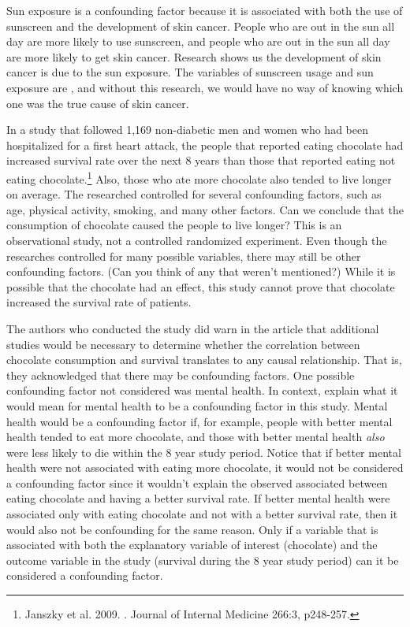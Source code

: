 Sun exposure is a confounding factor because it is associated with both the use of sunscreen and the development of skin cancer. People who are out in the sun all day are more likely to use sunscreen, and people who are out in the sun all day are more likely to get skin cancer. Research shows us the development of skin cancer is due to the sun exposure. The variables of sunscreen usage and sun exposure are , and without this research, we would have no way of knowing which one was the true cause of skin cancer.

\begin{example}{In a study that followed 1,169 non-diabetic men and women who had been hospitalized for a first heart attack, the people that reported eating chocolate had increased survival rate over the next 8 years than those that reported eating not eating chocolate.\footnote{Janszky et al. 2009. . Journal of Internal Medicine 266:3, p248-257.} Also, those who ate more chocolate also tended to live longer on average. The researched controlled for several confounding factors, such as age, physical activity, smoking, and many other factors. Can we conclude that the consumption of chocolate caused the people to live longer?} \label{confounding_2008_chocolate_health_study}
This is an observational study, not a controlled randomized experiment. Even though the researches controlled for many possible variables, there may still be other confounding factors. (Can you think of any that weren't mentioned?) While it is possible that the chocolate had an effect, this study cannot prove that chocolate increased the survival rate of patients.
\end{example}

\begin{example}{The authors who conducted the study did warn in the article that additional studies would be necessary to determine whether the correlation between chocolate consumption and survival translates to any causal relationship. That is, they acknowledged that there may be confounding factors. One possible confounding factor not considered was mental health. In context, explain what it would mean for mental health to be a confounding factor in this study.}
Mental health would be a confounding factor if, for example, people with better mental health tended to eat more chocolate, and those with better mental health \emph{also} were less likely to die within the 8 year study period. Notice that if better mental health were not associated with eating more chocolate, it would not be considered a confounding factor since it wouldn't explain the observed associated between eating chocolate and having a better survival rate. If better mental health were associated only with eating chocolate and not with a better survival rate, then it would also not be confounding for the same reason. Only if a variable that is associated with both the explanatory variable of interest (chocolate) and the outcome variable in the study (survival during the 8 year study period) can it be considered a confounding factor.
\end{example}

